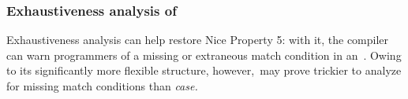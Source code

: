 \documentclass[manuscript,screen 12pt, nonacm]{acmart}
\begin{document}
        \subsubsection{Exhaustiveness analysis of~\VMinus}
        \label{typingppandvm}

        Exhaustiveness analysis can help restore Nice Property 5: with it, the
        compiler can warn programmers of a missing or extraneous match condition
        in an~\iffibf. Owing to its significantly more flexible structure,
        however,~\iffibf may prove trickier to analyze for missing match
        conditions than \it{case}.



\end{document}

